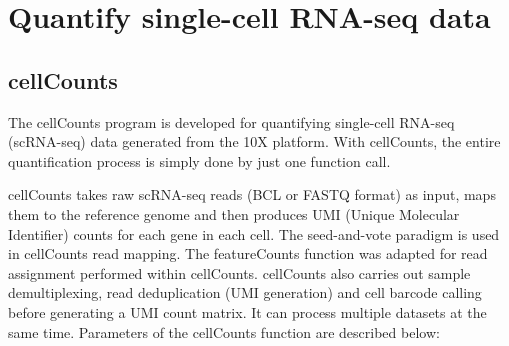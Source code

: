\documentclass[12pt]{report}
\newcommand{\featureCounts}{\textsf{featureCounts}}
\newcommand{\cellCounts}{\textsf{cellCounts}}
\begin{document}
\chapter{Quantify single-cell RNA-seq data}
\section{cellCounts}

The {\cellCounts} program is developed for quantifying single-cell RNA-seq (scRNA-seq) data generated from the 10X platform.
With {\cellCounts}, the entire quantification process is simply done by just one function call.

{\cellCounts} takes raw scRNA-seq reads (BCL or FASTQ format) as input, maps them to the reference genome and then produces UMI (Unique Molecular Identifier) counts for each gene in each cell. 
The seed-and-vote paradigm is used in {\cellCounts} read mapping. 
The {\featureCounts} function was adapted for read assignment performed within {\cellCounts}. 
{\cellCounts} also carries out sample demultiplexing, read deduplication (UMI generation) and cell barcode calling before generating a UMI count matrix. 
It can process multiple datasets at the same time.
Parameters of the {\cellCounts} function are described below:
\end{document}

